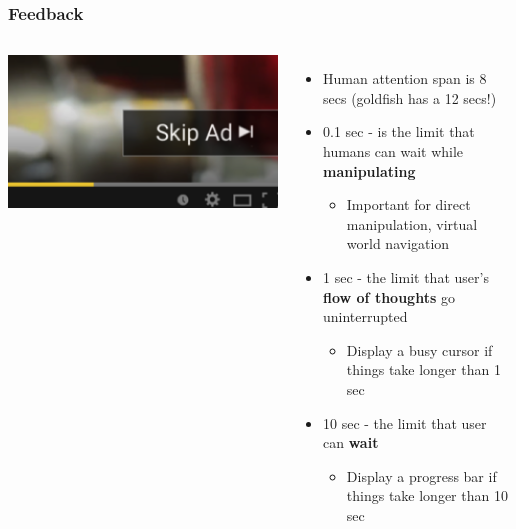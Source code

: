 \documentclass{beamer}
\begin{document}
\begin{frame}
\frametitle{Feedback}

\begin{columns}[c] %
	
	\includegraphics[width=1\linewidth]{youtube}
	
	\begin{itemize}
		\item Human attention span is 8 secs (goldfish has a 12 secs!)
		\item 0.1 sec - is the limit that humans can wait while \textbf{manipulating}
		\begin{itemize}
			\item Important for direct manipulation, virtual world navigation
		\end{itemize}
		\item 1 sec - the limit that user's \textbf{flow of thoughts} go uninterrupted
		\begin{itemize}
			\item Display a busy cursor if things take longer than 1 sec
		\end{itemize}
		\item 10 sec - the limit that user can \textbf{wait}
		\begin{itemize}
			\item Display a progress bar if things take longer than 10 sec
		\end{itemize}
	\end{itemize}
\end{columns}
\end{frame}

%
%	
\end{document}
